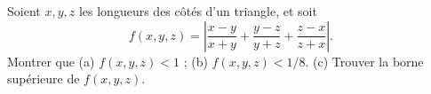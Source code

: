 Soient $x, y, z$ les longueurs des côtés d'un triangle, et soit
\[ f(x, y, z) = \left|\frac{x - y}{x + y} + \frac{y - z}{y + z} + \frac{z - x}{z + x}\right|. \]
Montrer que (a) $f(x, y, z) < 1$ ; (b) $f(x, y, z) < 1/8$. (c) Trouver la borne supérieure de $f(x, y, z)$.

